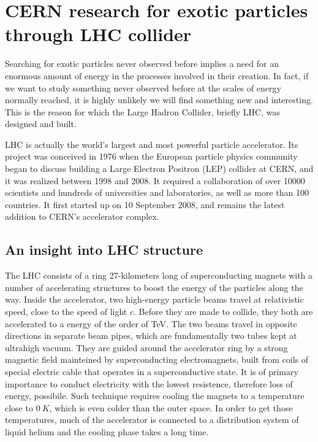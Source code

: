 \chapter{CERN research for exotic particles through LHC collider}
\label{chap:LHC}





Searching for exotic particles never observed before implies a need for an enormous amount of energy in the processes involved in their creation. In fact, if we want to study something never observed before at the scales of energy normally reached, it is highly unlikely we will find something new and interesting. This is the reason for which the Large Hadron Collider, briefly LHC, was designed and built.

LHC is actually the world's largest and most powerful particle accelerator. Its project was conceived in 1976 when the European particle physics community began to discuss building a Large Electron Positron (LEP) collider at CERN, and it was realized between 1998 and 2008. It required a collaboration of over 10000 scientists and hundreds of universities and laboratories, as well as more than 100 countries. It first started up on 10 September 2008, and remains the latest addition to CERN’s accelerator complex.






\section{An insight into LHC structure}
The LHC consists of a ring 27-kilometers long of superconducting magnets with a number of accelerating structures to boost the energy of the particles along the way. Inside the accelerator, two high-energy particle beams travel at relativistic speed, close to the speed of light $c$. Before they are made to collide, they both are accelerated to a energy of the order of TeV. The two beams travel in opposite directions in separate beam pipes, which are fundamentally two tubes kept at ultrahigh vacuum. They are guided around the accelerator ring by a strong magnetic field mainteined by superconducting electromagnets, built from coils of special electric cable that operates in a superconductive state. It is of primary importance to conduct electricity with the lowest resistence, therefore loss of energy, possibile. Such technique requires cooling the magnets to a temperature close to $0~\si{K}$, which is even colder than the outer space. In order to get those temperatures, much of the accelerator is connected to a distribution system of liquid helium and the cooling phase takes a long time.

